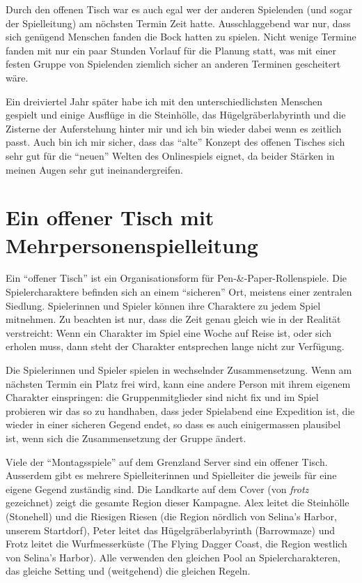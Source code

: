 \documentclass[11pt]{wbzine}
\begin{document}
\begin{multicols}{2}
Durch den offenen Tisch war es auch egal wer der anderen Spielenden (und
sogar der Spielleitung) am nöchsten Termin Zeit hatte. Ausschlaggebend
war nur, dass sich genügend Menschen fanden die Bock hatten zu
spielen. Nicht wenige Termine fanden mit nur ein paar Stunden Vorlauf
für die Planung statt, was mit einer festen Gruppe von Spielenden
ziemlich sicher an anderen Terminen gescheitert wäre.

Ein dreiviertel Jahr später habe ich mit den unterschiedlichsten
Menschen gespielt und einige Ausflüge in die Steinhölle, das
Hügelgräberlabyrinth und die Zisterne der Auferstehung hinter mir und
ich bin wieder dabei wenn es zeitlich passt. Auch bin ich mir sicher,
dass das ``alte'' Konzept des offenen Tisches sich sehr gut für die ``neuen''
Welten des Onlinespiels eignet, da beider Stärken in meinen Augen sehr
gut ineinandergreifen.


\section{Ein offener Tisch mit Mehrpersonenspielleitung}

Ein “offener Tisch” ist ein Organisationsform für Pen-\&-Paper-Rollenspiele.
Die Spielercharaktere befinden sich an einem “sicheren” Ort, meistens einer
zentralen Siedlung. Spielerinnen und Spieler können ihre Charaktere zu jedem
Spiel mitnehmen. Zu beachten ist nur, dass die Zeit genau gleich wie in der
Realität verstreicht: Wenn ein Charakter im Spiel eine Woche auf Reise ist,
oder sich erholen muss, dann steht der Charakter entsprechen lange nicht zur
Verfügung.

Die Spielerinnen und Spieler spielen in wechselnder Zusammensetzung. Wenn am
nächsten Termin ein Platz frei wird, kann eine andere Person mit ihrem eigenem
Charakter einspringen: die Gruppenmitglieder sind nicht fix und im Spiel
probieren wir das so zu handhaben, dass jeder Spielabend eine Expedition ist,
die wieder in einer sicheren Gegend endet, so dass es auch einigermassen
plausibel ist, wenn sich die Zusammensetzung der Gruppe ändert.

Viele der ``Montagsspiele'' auf dem Grenzland Server sind ein offener Tisch.
Ausserdem gibt es mehrere Spielleiterinnen und Spielleiter die jeweils für
eine eigene Gegend zuständig sind. Die Landkarte auf dem Cover (von \textit{frotz}
gezeichnet) zeigt die
gesamte Region dieser Kampagne. Alex leitet die Steinhölle (Stonehell) und die
Riesigen Riesen (die Region nördlich von Selina's Harbor, unserem Startdorf),
Peter leitet das Hügelgräberlabyrinth (Barrowmaze) und Frotz leitet die
Wurfmesserküste (The Flying Dagger Coast, die Region westlich von Selina's
Harbor). Alle verwenden den gleichen Pool an Spielercharakteren, das gleiche
Setting und (weitgehend) die gleichen Regeln.


\end{multicols}
\end{document}
